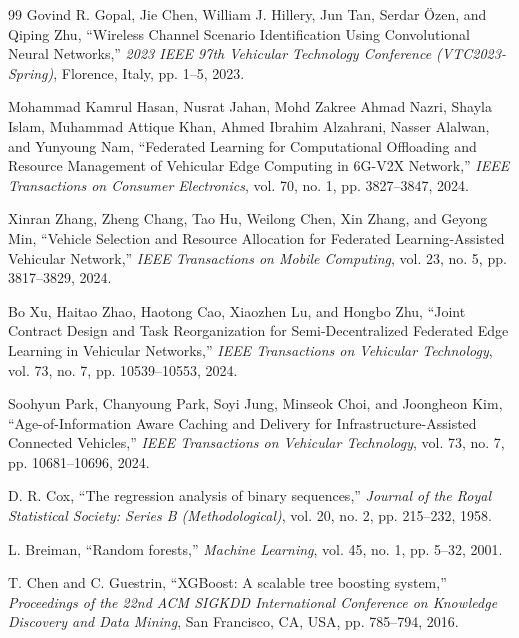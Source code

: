 \documentclass[journal]{IEEEtran}
\begin{document}
\begin{thebibliography}{99}
Govind R. Gopal, Jie Chen, William J. Hillery, Jun Tan, Serdar Özen, and Qiping Zhu, ``Wireless Channel Scenario Identification Using Convolutional Neural Networks,'' \emph{2023 IEEE 97th Vehicular Technology Conference (VTC2023-Spring)}, Florence, Italy, pp. 1--5, 2023.%

Mohammad Kamrul Hasan, Nusrat Jahan, Mohd Zakree Ahmad Nazri, Shayla Islam, Muhammad Attique Khan, Ahmed Ibrahim Alzahrani, Nasser Alalwan, and Yunyoung Nam, ``Federated Learning for Computational Offloading and Resource Management of Vehicular Edge Computing in 6G-V2X Network,'' \emph{IEEE Transactions on Consumer Electronics}, vol. 70, no. 1, pp. 3827--3847, 2024.%

Xinran Zhang, Zheng Chang, Tao Hu, Weilong Chen, Xin Zhang, and Geyong Min, ``Vehicle Selection and Resource Allocation for Federated Learning-Assisted Vehicular Network,'' \emph{IEEE Transactions on Mobile Computing}, vol. 23, no. 5, pp. 3817--3829, 2024.%

Bo Xu, Haitao Zhao, Haotong Cao, Xiaozhen Lu, and Hongbo Zhu, ``Joint Contract Design and Task Reorganization for Semi-Decentralized Federated Edge Learning in Vehicular Networks,'' \emph{IEEE Transactions on Vehicular Technology}, vol. 73, no. 7, pp. 10539--10553, 2024.%

Soohyun Park, Chanyoung Park, Soyi Jung, Minseok Choi, and Joongheon Kim, ``Age-of-Information Aware Caching and Delivery for Infrastructure-Assisted Connected Vehicles,'' \emph{IEEE Transactions on Vehicular Technology}, vol. 73, no. 7, pp. 10681--10696, 2024.%

D. R. Cox, ``The regression analysis of binary sequences,'' \emph{Journal of the Royal Statistical Society: Series B (Methodological)}, vol. 20, no. 2, pp. 215--232, 1958.%

L. Breiman, ``Random forests,'' \emph{Machine Learning}, vol. 45, no. 1, pp. 5--32, 2001.%

T. Chen and C. Guestrin, ``XGBoost: A scalable tree boosting system,'' \emph{Proceedings of the 22nd ACM SIGKDD International Conference on Knowledge Discovery and Data Mining}, San Francisco, CA, USA, pp. 785--794, 2016.%


\end{thebibliography}
\end{document}
